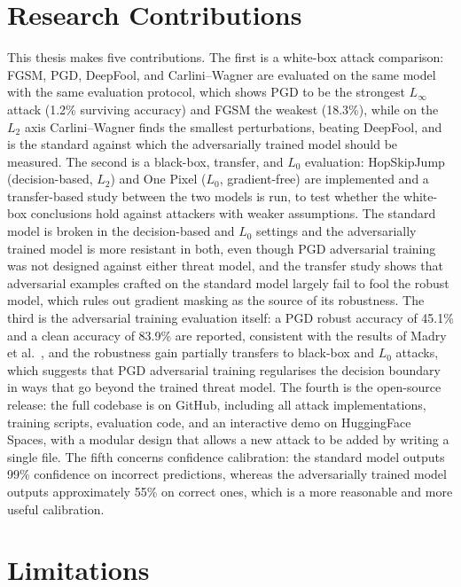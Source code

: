 \section{Research Contributions}

This thesis makes five contributions. The first is a white-box attack comparison: FGSM, PGD, DeepFool, and Carlini--Wagner are evaluated on the same model with the same evaluation protocol, which shows PGD to be the strongest $L_\infty$ attack (1.2\% surviving accuracy) and FGSM the weakest (18.3\%), while on the $L_2$ axis Carlini--Wagner finds the smallest perturbations, beating DeepFool, and is the standard against which the adversarially trained model should be measured. The second is a black-box, transfer, and $L_0$ evaluation: HopSkipJump (decision-based, $L_2$) and One Pixel ($L_0$, gradient-free) are implemented and a transfer-based study between the two models is run, to test whether the white-box conclusions hold against attackers with weaker assumptions. The standard model is broken in the decision-based and $L_0$ settings and the adversarially trained model is more resistant in both, even though PGD adversarial training was not designed against either threat model, and the transfer study shows that adversarial examples crafted on the standard model largely fail to fool the robust model, which rules out gradient masking as the source of its robustness. The third is the adversarial training evaluation itself: a PGD robust accuracy of 45.1\% and a clean accuracy of 83.9\% are reported, consistent with the results of Madry et al.~\cite{madry2018towards}, and the robustness gain partially transfers to black-box and $L_0$ attacks, which suggests that PGD adversarial training regularises the decision boundary in ways that go beyond the trained threat model. The fourth is the open-source release: the full codebase is on GitHub, including all attack implementations, training scripts, evaluation code, and an interactive demo on HuggingFace Spaces, with a modular design that allows a new attack to be added by writing a single file. The fifth concerns confidence calibration: the standard model outputs 99\% confidence on incorrect predictions, whereas the adversarially trained model outputs approximately 55\% on correct ones, which is a more reasonable and more useful calibration.

\section{Limitations}

